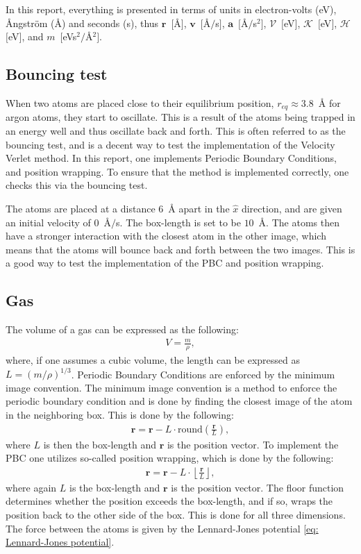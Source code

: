 \documentclass[a4paper]{article}
\newcommand{\newparagraph}{\vspace{.5cm}\noindent}
\begin{document}
\newparagraph
In this report, everything is presented in terms of units in electron-volts (eV), Ångström (Å) and seconds (s), thus $\mathbf{r}$~$[$Å$]$, $\mathbf{v}$~$[$Å$/$s$]$, $\mathbf{a}$~$[$Å$/$s$^2]$, $\mathcal{V}$~$[$eV$]$, $\mathcal{K}$~$[$eV$]$, $\mathcal{H}$~$[$eV$]$, and $m$~$[$eVs$^2/$Å$^2]$.


\subsection{Bouncing test}\label{sec: Bouncing test method}
When two atoms are placed close to their equilibrium position, $r_{eq} \approx 3.8$~Å for argon atoms, they start to oscillate. This is a result of the atoms being trapped in an energy well and thus oscillate back and forth. 
This is often referred to as the bouncing test, and is a decent way to test the implementation of the Velocity Verlet method. In this report, one implements Periodic Boundary Conditions, and position wrapping. To ensure that the method is implemented correctly, one checks this via the bouncing test.

\newparagraph
The atoms are placed at a distance $6$~Å apart in the $\hat{x}$ direction, and are given an initial velocity of $0$~Å$/$s. The box-length is set to be $10$~Å. The atoms then have a stronger interaction with the closest atom in the other image, which means that the atoms will bounce back and forth between the two images. This is a good way to test the implementation of the PBC and position wrapping.

\subsection{Gas}
The volume of a gas can be expressed as the following:
\begin{align*}
    V = \frac{m}{\rho},
\end{align*}where, if one assumes a cubic volume, the length can be expressed as $L = (m/\rho)^{1/3}$. Periodic Boundary Conditions are enforced by the minimum image convention.
The minimum image convention is a method to enforce the periodic boundary condition and is done by finding the closest image of the atom in the neighboring box. This is done by the following:
\begin{align*}
    \mathbf{r}= \mathbf{r} - L\cdot\text{round}\left(\frac{\mathbf{r}}{L}\right),
\end{align*}where $L$ is then the box-length and $\mathbf{r}$ is the position vector. To implement the PBC one utilizes so-called position wrapping, which is done by the following:
\begin{align*}
    \mathbf{r} = \mathbf{r} - L\cdot\left\lfloor\frac{\mathbf{r}}{L}\right\rfloor,
\end{align*}where again $L$ is the box-length and $\mathbf{r}$ is the position vector. The floor function determines whether the position exceeds the box-length, and if so, wraps the position back to the other side of the box. This is done for all three dimensions. The force between the atoms is given by the Lennard-Jones potential \eqref{eq: Lennard-Jones potential}.
\end{document}
